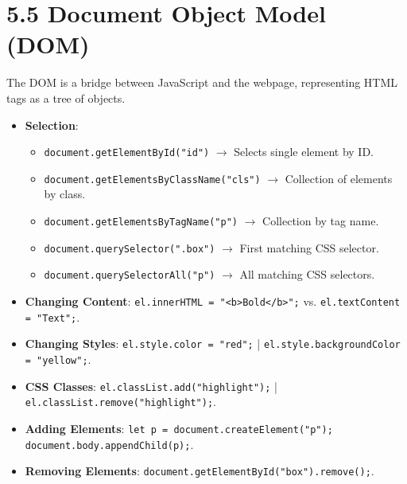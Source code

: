 \section{5.5 Document Object Model (DOM)}
The DOM is a bridge between JavaScript and the webpage, representing HTML tags as a tree of objects.
\begin{itemize}[leftmargin=*]
    \item \textbf{Selection}:
    \begin{itemize}
        \item \texttt{document.getElementById("id")} $\to$ Selects single element by ID.
        \item \texttt{document.getElementsByClassName("cls")} $\to$ Collection of elements by class.
        \item \texttt{document.getElementsByTagName("p")} $\to$ Collection by tag name.
        \item \texttt{document.querySelector(".box")} $\to$ First matching CSS selector.
        \item \texttt{document.querySelectorAll("p")} $\to$ All matching CSS selectors.
    \end{itemize}
    \item \textbf{Changing Content}: \texttt{el.innerHTML = "<b>Bold</b>";} vs. \texttt{el.textContent = "Text";}.
    \item \textbf{Changing Styles}: \texttt{el.style.color = "red";} | \texttt{el.style.backgroundColor = "yellow";}.
    \item \textbf{CSS Classes}: \texttt{el.classList.add("highlight");} | \texttt{el.classList.remove("highlight");}.
    \item \textbf{Adding Elements}: \texttt{let p = document.createElement("p"); document.body.appendChild(p);}.
    \item \textbf{Removing Elements}: \texttt{document.getElementById("box").remove();}.
\end{itemize}

